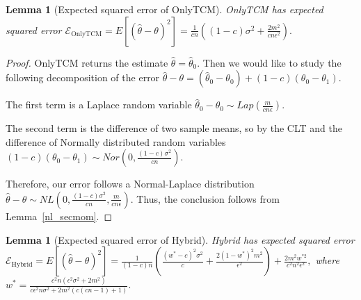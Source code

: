 \documentclass{article}
\newcommand{\ak}[1]{\textcolor{blue}{\bf\small [#1 --Aleksandra]}}
\theoremstyle{plain}
\newtheorem{lem}[thm]{Lemma}
\begin{document}
\begin{lem}[Expected squared error of OnlyTCM]
\label{MSE_OnlyTCM}
OnlyTCM has expected squared error
$\mathcal{E}_{\text{OnlyTCM}} = E[(\hat{\theta} - \theta)^2] = \frac{1}{cn}\left((1-c)\sigma^2 + \frac{2m^2}{cn \epsilon^2 }\right).$
\end{lem}
\begin{proof}
OnlyTCM returns the estimate $\hat{\theta} = \hat{\theta}_0$. Then we would like to study the following decomposition of the error
$\hat{\theta} - \theta = (\hat{\theta}_0 - \theta_0) + (1-c)(\theta_0 - \theta_1).$

The first term is a Laplace random variable
$\hat{\theta}_0 - \theta_0 \sim Lap\left(\frac{m}{cn\epsilon}\right).$

The second term is the difference of two sample means, so by the CLT and the difference of Normally distributed random variables
$(1-c)(\theta_0 - \theta_1) \sim Nor\left(0, \frac{(1-c)\sigma^2}{cn}\right).$

Therefore, our error follows a Normal-Laplace distribution
$\hat{\theta} - \theta \sim NL\left(0, \frac{(1-c)\sigma^2}{cn}, \frac{m}{cn\epsilon} \right).$
Thus, the conclusion follows from Lemma~\ref{nl_secmom}.
\end{proof}

\begin{lem}[Expected squared error of Hybrid]\label{lem:hybrid-error}
Hybrid has expected squared error 
$\mathcal{E}_{\text{Hybrid}} = E[(\hat{\theta} - \theta)^2] = \frac{1}{(1-c)n}\left(\frac{(w^*-c)^2\sigma^2}{c} + \frac{2(1-w^*)^2 m^2}{\epsilon^2}\right) + \frac{2m^2w^{*2}}{c^2n^2\epsilon^2},$
where
$w^* = \frac{c^2 n \left(\epsilon^2 \sigma^2+2 m^2\right)}{c \epsilon^2 n \sigma^2+2 m^2 (c (c n-1)+1)}.$
\end{lem}

\end{document}
